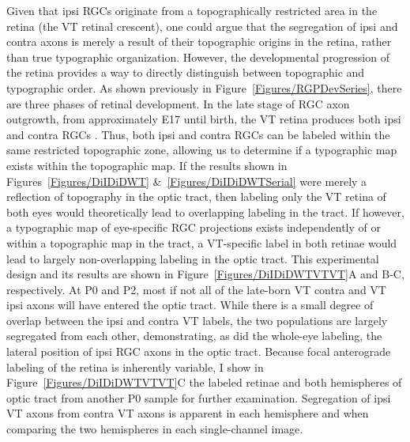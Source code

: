 Given that ipsi RGCs originate from a topographically restricted area in the retina (the VT retinal crescent), one could argue that the segregation of ipsi and contra axons is merely a result of their topographic origins in the retina, rather than true typographic organization.
However, the developmental progression of the retina provides a way to directly distinguish between topographic and typographic order.
As shown previously in Figure~\ref{Figures/RGPDevSeries}, there are three phases of retinal development.
In the late stage of RGC axon outgrowth, from approximately E17 until birth, the VT retina produces both ipsi and contra RGCs \cite{drager1985birth}.
Thus, both ipsi and contra RGCs can be labeled within the same restricted topographic zone, allowing us to determine if a typographic map exists within the topographic map.
If the results shown in Figures~\ref{Figures/DiIDiDWT} \&~\ref{Figures/DiIDiDWTSerial} were merely a reflection of topography in the optic tract, then labeling only the VT retina of both eyes would theoretically lead to overlapping labeling in the tract.
If however, a typographic map of eye-specific RGC projections exists independently of or within a topographic map in the tract, a VT-specific label in both retinae would lead to largely non-overlapping labeling in the optic tract.
This experimental design and its results are shown in Figure~\ref{Figures/DiIDiDWTVTVT}A and B-C, respectively.
At P0 and P2, most if not all of the late-born VT contra and VT ipsi axons will have entered the optic tract.
While there is a small degree of overlap between the ipsi and contra VT labels, the two populations are largely segregated from each other, demonstrating, as did the whole-eye labeling, the lateral position of ipsi RGC axons in the optic tract.
Because focal anterograde labeling of the retina is inherently variable, I show in Figure~\ref{Figures/DiIDiDWTVTVT}C the labeled retinae and both hemispheres of optic tract from another P0 sample for further examination.
Segregation of ipsi VT axons from contra VT axons is apparent in each hemisphere and when comparing the two hemispheres in each single-channel image.

